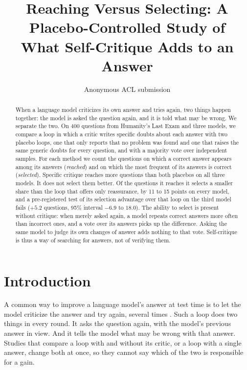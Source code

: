 \documentclass[11pt]{article}
\title{Reaching Versus Selecting: A Placebo-Controlled Study of\\What Self-Critique Adds to an Answer}
\author{Anonymous ACL submission}
\begin{document}
\maketitle

\begin{abstract}
When a language model criticizes its own answer and tries again, two things happen together: the model is asked the question again, and it is told what may be wrong.
We separate the two.
On 400 questions from Humanity's Last Exam and three models, we compare a loop in which a critic writes specific doubts about each answer with two placebo loops, one that only reports that no problem was found and one that raises the same generic doubts for every question, and with a majority vote over independent samples.
For each method we count the questions on which a correct answer appears among its answers (\emph{reached}) and on which the most frequent of its answers is correct (\emph{selected}).
Specific critique reaches more questions than both placebos on all three models.
It does not select them better.
Of the questions it reaches it selects a smaller share than the loop that offers only reassurance, by 11 to 15 points on every model, and a pre-registered test of its selection advantage over that loop on the third model fails ($+5.2$ questions, 95\% interval $-6.9$ to $18.0$).
The ability to select is present without critique: when merely asked again, a model repeats correct answers more often than incorrect ones, and a vote over its answers picks up the difference.
Asking the same model to judge its own changes of answer adds nothing to that vote.
Self-critique is thus a way of searching for answers, not of verifying them.
\end{abstract}

\section{Introduction}

A common way to improve a language model's answer at test time is to let the model criticize the answer and try again, several times \citep{madaan2023selfrefine,shinn2023reflexion}.
Such a loop does two things in every round.
It asks the question again, with the model's previous answer in view.
And it tells the model what may be wrong with that answer.
Studies that compare a loop with and without its critic, or a loop with a single answer, change both at once, so they cannot say which of the two is responsible for a gain.
\end{document}
